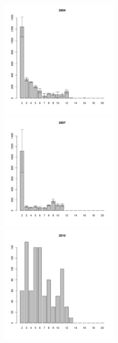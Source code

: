 	\begin{figure}[hp]

	\begin{minipage}[b]{.3\linewidth}
	\begin{center}
	\includegraphics[width=60mm]{../White_Sea/Luvenga_Goreliy/high2_2004_.pdf}
	\end{center}
	\end{minipage}
	\hfill
	\begin{minipage}[b]{.3\linewidth}
	\begin{center}
	\includegraphics[width=60mm]{../White_Sea/Luvenga_Goreliy/high2_2007_.pdf}
	\end{center}
	\end{minipage}
	\hfill
	\begin{minipage}[b]{.3\linewidth}
	\begin{center}
	\includegraphics[width=60mm]{../White_Sea/Luvenga_Goreliy/high2_2010_.pdf}

\end{center}
\end{minipage}
\end{figure}
